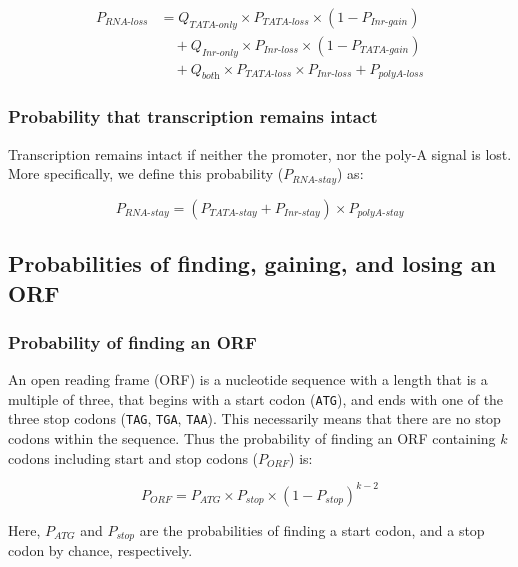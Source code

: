 \documentclass[12pt,a4paper]{article}
\begin{document}
\begin{align}
P_\textit{RNA-loss} & = Q_\textit{TATA-only} \times P_\textit{TATA-loss}\times(1-P_\textit{Inr-gain}) \nonumber\\[1pt]
 & \quad + Q_\textit{Inr-only}\times P_\textit{Inr-loss}\times(1-P_\textit{TATA-gain}) \nonumber \\[1pt]
 & \quad + Q_\textit{both}\times P_\textit{TATA-loss} \times P_\textit{Inr-loss} + P_\textit{polyA-loss}
\label{eqrnaloss}
\end{align}

\subsubsection{Probability that transcription remains intact}

Transcription remains intact if neither the promoter, nor the poly-A signal is lost. More specifically, we define this probability ($P_\textit{RNA-stay}$) as:

\begin{equation}
P_\textit{RNA-stay} = (P_\textit{TATA-stay} + P_\textit{Inr-stay}) \times P_\textit{polyA-stay}
\label{eqrnastay}
\end{equation}

\subsection{Probabilities of finding, gaining, and losing an ORF}

\subsubsection{Probability of finding an ORF}

An open reading frame (ORF) is a nucleotide sequence with a length that is a multiple of three, that begins with a start codon (\texttt{ATG}), and ends with one of the three stop codons (\texttt{TAG}, \texttt{TGA}, \texttt{TAA}). This necessarily means that there are no stop codons within the sequence. Thus the probability of finding an ORF containing $k$ codons including start and stop codons ($P_\textit{ORF}$) is: 

\begin{equation}
P_\textit{ORF} = P_\textit{ATG} \times P_\textit{stop} \times (1 - P_\textit{stop})^{k-2}
\label{eqorfprob}
\end{equation}

Here, $P_\textit{ATG}$ and $P_\textit{stop}$ are the probabilities of finding a start codon, and a stop codon by chance, respectively.
\end{document}
